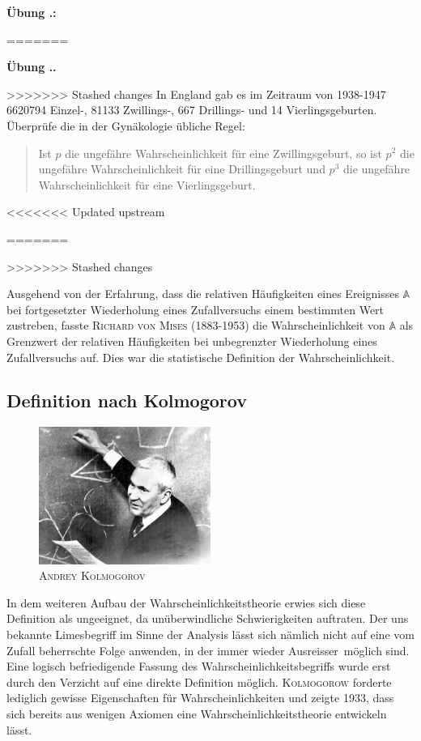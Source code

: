 \documentclass[%
<<<<<<< Updated upstream
11pt,%
twoside,%
titlepage,%
german,%
=======
11pt,%
twoside,%
titlepage,%
swissgerman,%
>>>>>>> Stashed changes
headsepline%
]{scrartcl}
\newcommand{\faEyeLightGray}{\textcolor{lightgray}{\faEye}} %
\newcommand{\faEyeLightGray}{\textcolor{lightgray}{\faEye}} %
\theoremstyle{definition}
\theoremstyle{plain}
\newcommand{\concatueb}[1]{ueb:#1}%
\newcommand{\concatlsg}[1]{lsg:#1}%
\newcounter{uebcounter}[section]
\renewcommand{\theuebcounter}{\thesection.\arabic{uebcounter}}  %
\newenvironment{uebenv}[1]{%
    \refstepcounter{uebcounter}
    \par\noindent\textbf{Übung \theuebcounter.}%
    \label{\concatueb{#1}}\hfill\hyperref[\concatlsg{#1}]{\faEyeLightGray}\par
}{%
    \par
}
\newcounter{theo}[section]\setcounter{theo}{0}
\newcommand{\concatueb}[1]{ueb:#1}%
\newcommand{\concatlsg}[1]{lsg:#1}%
\newcounter{uebcounter}[section]
\renewcommand{\theuebcounter}{\thesection.\arabic{uebcounter}}  %
\newcommand{\uebh}[2]{%
 \refstepcounter{uebcounter} %
 \par\noindent\textbf{Übung \theuebcounter:}\label{\concatueb{#1}} %
    #2
    \hfill\hyperref[\concatlsg{#1}]{\faEyeLightGray}
    \vspace{\parskip}
}
\newenvironment{uebenv}[1]{%
    \refstepcounter{uebcounter}
    \par\noindent\textbf{Übung \theuebcounter.}%
    \label{\concatueb{#1}}\hfill\hyperref[\concatlsg{#1}]{\faEyeLightGray}\newline
}{%
    \par
}
\begin{document}
\uebh{geburtenregel}{
=======
\end{uebenv}

\begin{uebenv}{geburtenregel}
>>>>>>> Stashed changes
In England gab es im Zeitraum von 1938-1947 6620794 Einzel-, 81133 Zwillings-, 667 Drillings- und 14 Vierlingsgeburten. Überprüfe die in der Gy\-nä\-ko\-lo\-gie übliche Regel:
\begin{quote}
Ist $p$ die ungefähre Wahrscheinlichkeit für eine Zwillingsgeburt, so ist $p^2$ die ungefähre Wahrscheinlichkeit für eine Drillingsgeburt und $p^3$ die ungefähre Wahrscheinlichkeit für eine Vierlingsgeburt.
\end{quote}
<<<<<<< Updated upstream
}
=======
\end{uebenv}
>>>>>>> Stashed changes

Ausgehend von der Erfahrung, dass die relativen Häufigkeiten eines Ereignisses $\mathbb{A}$ bei fortgesetzter Wiederholung eines Zufallversuchs einem bestimmten Wert zustreben, fasste \textsc{Richard von Mises} (1883-1953) die Wahrscheinlichkeit von $\mathbb{A}$ als Grenzwert der relativen Häufigkeiten bei unbegrenzter Wiederholung eines Zufallversuchs auf. Dies war die statistische Definition der Wahrscheinlichkeit.

\subsection{Definition nach Kolmogorov}

\begin{figure}
\centering
\includegraphics[width=0.5\textwidth]{pictures/kolmogorov}
\caption{\textsc{Andrey Kolmogorov}}
\end{figure}

In dem weiteren Aufbau der Wahrscheinlichkeitstheorie erwies sich diese Definition als ungeeignet, da unüberwindliche Schwierigkeiten auftraten. Der uns bekannte Limesbegriff im Sinne der Analysis lässt sich nämlich nicht auf eine vom Zufall beherrschte Folge anwenden, in der immer wieder \glqq Ausreisser\grqq\ möglich sind. Eine logisch befriedigende Fassung des Wahrscheinlichkeitsbegriffs wurde erst durch den Verzicht auf eine direkte Definition möglich. \textsc{Kolmogorow} forderte lediglich gewisse Eigenschaften für Wahrscheinlichkeiten und zeigte 1933, dass sich bereits aus wenigen Axiomen eine Wahrscheinlichkeitstheorie entwickeln lässt.
\end{document}
